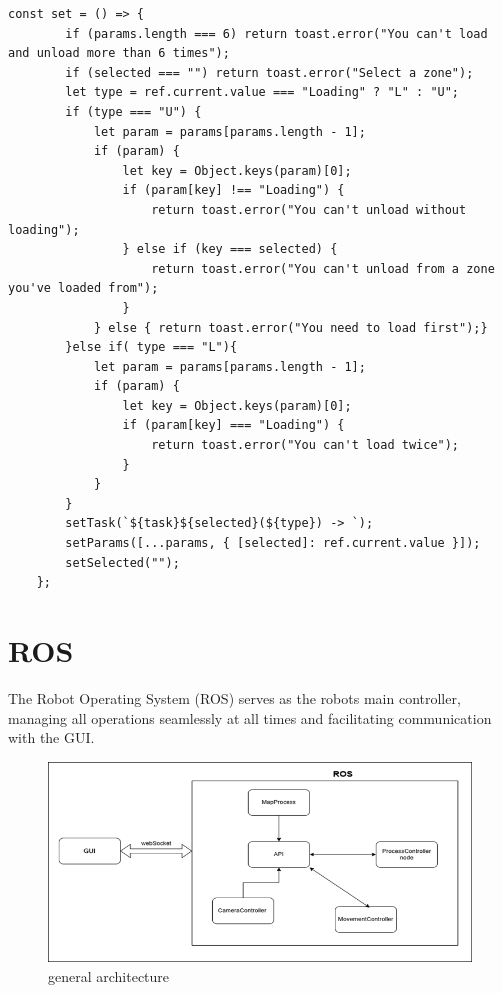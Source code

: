 \documentclass[a4paper,12pt]{extreport}
\begin{document}
\begin{verbatim}
const set = () => {
        if (params.length === 6) return toast.error("You can't load and unload more than 6 times");
        if (selected === "") return toast.error("Select a zone");
        let type = ref.current.value === "Loading" ? "L" : "U";
        if (type === "U") {
            let param = params[params.length - 1];
            if (param) {
                let key = Object.keys(param)[0];
                if (param[key] !== "Loading") {
                    return toast.error("You can't unload without loading");
                } else if (key === selected) {
                    return toast.error("You can't unload from a zone you've loaded from");
                }
            } else { return toast.error("You need to load first");}
        }else if( type === "L"){
            let param = params[params.length - 1];
            if (param) {
                let key = Object.keys(param)[0];
                if (param[key] === "Loading") {
                    return toast.error("You can't load twice");
                }
            }
        }
        setTask(`${task}${selected}(${type}) -> `);
        setParams([...params, { [selected]: ref.current.value }]);
        setSelected("");
    };
\end{verbatim}



\section{ROS}
The Robot Operating System (ROS) serves as the robot\textquotesingle s
main controller, managing all operations seamlessly at all times and
facilitating communication with the GUI.

\begin{figure}[h!]
\centering
\includegraphics[width=\textwidth]{img/image022.png}
\caption{general architecture}
\label{judFig15}
\end{figure}
\end{document}
